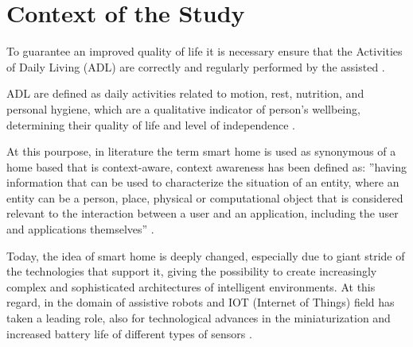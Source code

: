\documentclass{thesisreport}
\begin{document}
 
 \section{Context of the Study}
  To guarantee an improved quality of life it is necessary ensure that the Activities of Daily Living (ADL) are correctly and regularly performed by the assisted \cite{buoncompagni2017towards}.
 
 ADL are defined as daily activities related to motion, rest, nutrition, and personal hygiene, which are a qualitative indicator of person’s wellbeing, determining their quality of life and level of independence \cite{buoncompagni2017towards}. 
 
 At this pourpose, in literature the term smart home is used as synonymous of a home based that is context-aware, context awareness has been defined as: ”having information that can be used to characterize the situation of an entity, where an entity can be a person, place, physical or computational object that is considered relevant to the interaction between a user and an application, including the user and applications themselves” \cite{abowd1999towards}. 

 Today, the idea of smart home is deeply changed, especially due to giant stride of the technologies that support it, giving the possibility to create increasingly complex and sophisticated architectures of intelligent environments. At this regard, in the domain of assistive robots and IOT (Internet of Things) field has taken a leading role, also for technological advances in the miniaturization and increased battery life of different types of sensors \cite{phdthesis} \cite{nakashima2009handbook}.
 
\end{document}
